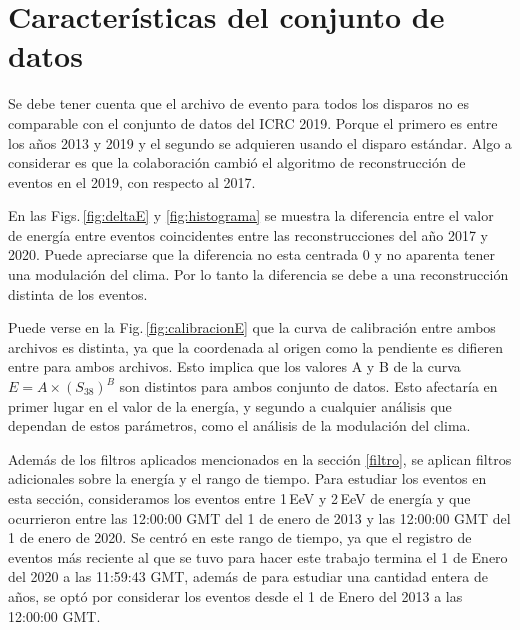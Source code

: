 \section{Características del conjunto de datos} \label{specs}

      Se debe tener cuenta que el archivo de evento para todos los disparos no es comparable con el conjunto  de datos del ICRC 2019. Porque el primero es entre los años 2013 y 2019 y el segundo se adquieren usando el disparo estándar.  Algo a considerar es que la colaboración cambió el algoritmo de reconstrucción de eventos en el 2019, con respecto al 2017.

      En las  Figs.\,\ref{fig:deltaE} y \ref{fig:histograma} se muestra la diferencia entre el valor de energía entre eventos coincidentes entre las reconstrucciones del año 2017 y 2020. Puede apreciarse que la diferencia no esta centrada 0 y no aparenta tener una modulación del clima. Por lo tanto la diferencia se debe a una reconstrucción distinta de los eventos.

      Puede verse en la Fig.\,\ref{fig:calibracionE} que la curva de calibración entre ambos archivos es distinta, ya que la coordenada al origen como la pendiente es difieren entre para ambos archivos. Esto implica que los valores A y B de la curva $E=A\times (S_{38})^B$ son distintos para ambos conjunto de datos. Esto afectaría en primer lugar en el valor de la energía, y segundo a cualquier análisis que dependan de estos parámetros, como el análisis de la modulación del clima.


	Además de los filtros aplicados mencionados en la sección \ref{filtro}, se aplican filtros adicionales sobre la energía y el rango de tiempo. Para estudiar los eventos en esta sección, consideramos los eventos entre 1\,EeV y 2\,EeV de energía y que ocurrieron entre las 12:00:00 GMT del 1 de enero de 2013 y las 12:00:00 GMT del 1 de enero de 2020. Se centró en este rango de tiempo, ya que el registro de eventos más reciente al que se tuvo para hacer este trabajo termina el 1 de Enero del 2020  a las 11:59:43 GMT, además de para estudiar una cantidad entera de años, se optó por considerar los eventos desde el 1 de Enero del 2013 a las 12:00:00 GMT.

